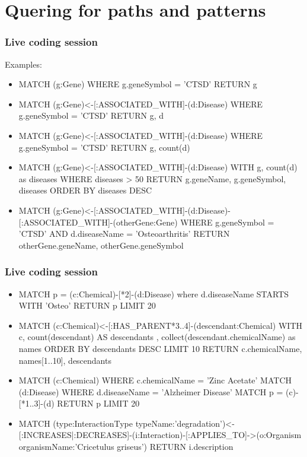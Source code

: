 \documentclass[12pt]{beamer}
\begin{document}
    \section{Quering for paths and patterns}
    \begin{frame}
        \frametitle{Live coding session}
        Examples:
        \begin{itemize}
            \item MATCH (g:Gene) WHERE g.geneSymbol = 'CTSD' RETURN g
            \item MATCH (g:Gene)<-[:ASSOCIATED\_WITH]-(d:Disease) WHERE g.geneSymbol = 'CTSD' RETURN g, d
            \item MATCH (g:Gene)<-[:ASSOCIATED\_WITH]-(d:Disease) WHERE g.geneSymbol = 'CTSD' RETURN g, count(d)
            \item MATCH (g:Gene)<-[:ASSOCIATED\_WITH]-(d:Disease) WITH g, count(d) as diseases WHERE diseases > 50 RETURN g.geneName, g.geneSymbol, diseases ORDER BY diseases DESC\\
            \item MATCH (g:Gene)<-[:ASSOCIATED\_WITH]-(d:Disease)-[:ASSOCIATED\_WITH]-(otherGene:Gene) WHERE g.geneSymbol = 'CTSD' AND d.diseaseName = 'Osteoarthritis' RETURN otherGene.geneName, otherGene.geneSymbol
        \end{itemize}
    \end{frame}
    
    \begin{frame}
        \frametitle{Live coding session}
        \begin{itemize}
            \item MATCH p = (c:Chemical)-[*2]-(d:Disease) where d.diseaseName STARTS WITH 'Osteo' RETURN p LIMIT 20
            \item MATCH (c:Chemical)<-[:HAS\_PARENT*3..4]-(descendant:Chemical) 
            WITH c, count(descendant) AS descendants , collect(descendant.chemicalName) as names ORDER BY descendants DESC LIMIT 10
            RETURN c.chemicalName, names[1..10], descendants
            \item MATCH (c:Chemical) WHERE c.chemicalName = 'Zinc Acetate'
            MATCH (d:Disease) WHERE d.diseaseName = 'Alzheimer Disease' 
            MATCH p = (c)-[*1..3]-(d)
            RETURN p LIMIT 20
            \item
            MATCH (type:InteractionType {typeName:'degradation'})<-[:INCREASES|:DECREASES]-(i:Interaction)-[:APPLIES_TO]->(o:Organism {organismName:'Cricetulus griseus'}) RETURN i.description
        \end{itemize}
    \end{frame}
    
\end{document}
